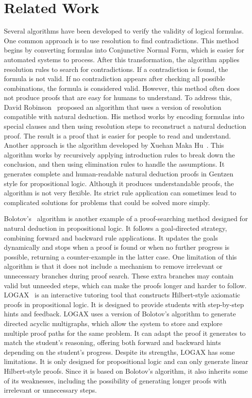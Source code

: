 \documentclass[runningheads]{llncs}
\begin{document}
\section{Related Work}
Several algorithms have been developed to verify the validity of logical formulas. One common approach is to use resolution to find contradictions. This method begins by converting formulas into Conjunctive Normal Form, which is easier for automated systems to process. After this transformation, the algorithm applies resolution rules to search for contradictions. If a contradiction is found, the formula is not valid. If no contradiction appears after checking all possible combinations, the formula is considered valid. However, this method often does not produce proofs that are easy for humans to understand.
To address this, David Robinson~\cite{robinson_using} proposed an algorithm that uses a version of resolution compatible with natural deduction. His method works by encoding formulas into special clauses and then using resolution steps to reconstruct a natural deduction proof. The result is a proof that is easier for people to read and understand.
Another approach is the algorithm developed by Xuehan Maka Hu~\cite{makahu_automatic}. This algorithm works by recursively applying introduction rules to break down the conclusion, and then using elimination rules to handle the assumptions. It generates complete and human-readable natural deduction proofs in Gentzen style for propositional logic. Although it produces understandable proofs, the algorithm is not very flexible. Its strict rule application can sometimes lead to complicated solutions for problems that could be solved more simply.

Bolotov's~\cite{bolotov_2005_automated} algorithm is another example of a proof-searching method designed for natural deduction in propositional logic. It follows a goal-directed strategy, combining forward and backward rule applications. It updates the goals dynamically and stops when a proof is found or when no further progress is possible, returning a counter-example in the latter case. One limitation of this algorithm is that it does not include a mechanism to remove irrelevant or unnecessary branches during proof search. These extra branches may contain valid but unneeded steps, which can make the proofs longer and harder to follow.
LOGAX~\cite{lodder_2020_generation} is an interactive tutoring tool that constructs Hilbert-style axiomatic proofs in propositional logic. It is designed to provide students with step-by-step hints and feedback. LOGAX uses a version of Bolotov's algorithm to generate directed acyclic multigraphs, which allow the system to store and explore multiple proof paths for the same problem. It can adapt the proof it generates to match the student's reasoning, offering both forward and backward hints depending on the student's progress. Despite its strengths, LOGAX has some limitations. It is only designed for propositional logic and can only generate linear Hilbert-style proofs. Since it is based on Bolotov's algorithm, it also inherits some of its weaknesses, including the possibility of generating longer proofs with irrelevant or unnecessary steps.
\end{document}

